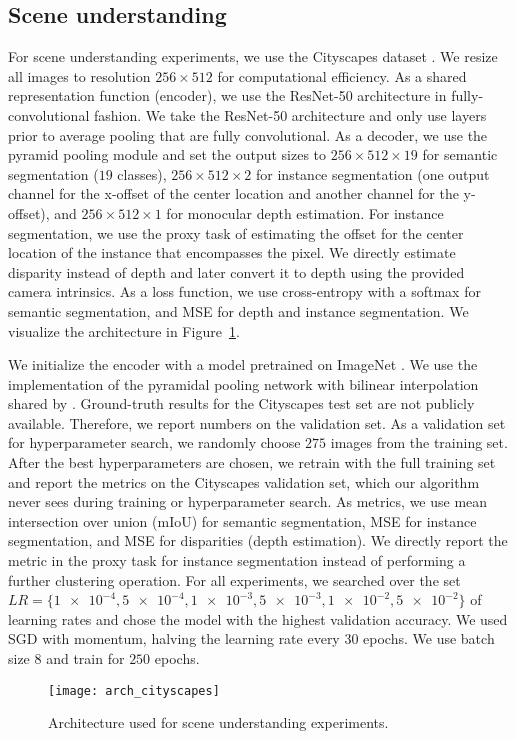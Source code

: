 \documentclass{article}
\begin{document}
\subsection{Scene understanding}
For scene understanding experiments, we use the Cityscapes dataset \citep{cityscapes}. We resize all images to resolution $256\times512$ for computational efficiency. As a shared representation function (encoder), we use the ResNet-50 architecture \citep{resnet} in fully-convolutional fashion. We take the ResNet-50 architecture and only use layers prior to average pooling that are fully convolutional. As a decoder, we use the pyramid pooling module \citep{pspnet} and set the output sizes to $256\times512\times19$ for semantic segmentation ($19$ classes), $256\times512\times2$ for instance segmentation (one output channel for the x-offset of the center location and another channel for the y-offset), and $256\times512\times1$ for monocular depth estimation. For instance segmentation, we use the proxy task of estimating the offset for the center location of the instance that encompasses the pixel. We directly estimate disparity instead of depth and later convert it to depth using the provided camera intrinsics. As a loss function, we use cross-entropy with a softmax for semantic segmentation, and MSE for depth and instance segmentation. We visualize the architecture in Figure~\ref{fig:scene}.

We initialize the encoder with a model pretrained on ImageNet \citep{imagenet}. We use the implementation of the pyramidal pooling network with bilinear interpolation shared by \citet{pspnet_implementation}. Ground-truth results for the Cityscapes test set are not publicly available. Therefore, we report numbers on the validation set. As a validation set for hyperparameter search, we randomly choose $275$ images from the training set. After the best hyperparameters are chosen, we retrain with the full training set and report the metrics on the Cityscapes validation set, which our algorithm never sees during training or hyperparameter search. As metrics, we use mean intersection over union (mIoU) for semantic segmentation, MSE for instance segmentation, and MSE for disparities (depth estimation). We directly report the metric in the proxy task for instance segmentation instead of performing a further clustering operation. For all experiments, we searched over the set $LR=\{\num{1e-4}, \num{5e-4}, \num{1e-3}, \num{5e-3}, \num{1e-2}, \num{5e-2}\}$ of learning rates and chose the model with the highest validation accuracy. We used SGD with momentum, halving the learning rate every 30 epochs. We use batch size $8$ and train for $250$ epochs.

\begin{figure}[ht]
\texttt{[image: arch\_cityscapes]}
\caption{Architecture used for scene understanding experiments.}
\label{fig:scene}
\end{figure}
 
\end{document}
